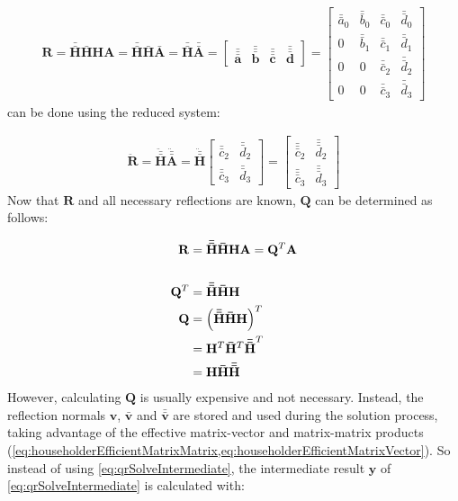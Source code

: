 \begin{align}
\mathbf{R}
= 
\mathbf{\bar{\bar{H}}}\mathbf{\bar{H}}\mathbf{H}\mathbf{A} 
= 
\mathbf{\bar{\bar{H}}}\mathbf{\bar{H}}\mathbf{\bar{A}}
= 
\mathbf{\bar{\bar{H}}}\mathbf{\bar{\bar{A}}}
=
\begin{bmatrix}
\mathbf{\bar{\bar{\bar{a}}}}&\mathbf{\bar{\bar{\bar{b}}}}&\mathbf{\bar{\bar{\bar{c}}}}&\mathbf{\bar{\bar{\bar{d}}}}
\end{bmatrix}	
=
\begin{bmatrix}
\bar{\bar{a}}_0&\bar{\bar{b}}_0&\bar{\bar{c}}_0&\bar{\bar{d}}_0\\
0              &\bar{\bar{b}}_1&\bar{\bar{c}}_1&\bar{\bar{d}}_1\\
0              &0              &\bar{\bar{c}}_2&\bar{\bar{d}}_2\\
0              &0              &\bar{\bar{c}}_3&\bar{\bar{d}}_3
\end{bmatrix}					  
\end{align}
%
can be done using the reduced system:

\begin{align}
\mathbf{\ddot{R}}
= 
\mathbf{\ddot{\bar{\bar{H}}}}\mathbf{\ddot{\bar{\bar{A}}}}
=
\mathbf{\ddot{\bar{\bar{H}}}}
\begin{bmatrix}
\bar{\bar{c}}_2&\bar{\bar{d}}_2\\
\bar{\bar{c}}_3&\bar{\bar{d}}_3
\end{bmatrix}	
=
\begin{bmatrix}
\bar{\bar{\bar{c}}}_2&\bar{\bar{\bar{d}}}_2\\
\bar{\bar{\bar{c}}}_3&\bar{\bar{\bar{d}}}_3
\end{bmatrix}					  
\end{align}
%
Now that $\mathbf{R}$ and all necessary reflections are known, $\mathbf{Q}$ can be determined as follows:

\begin{align}
\mathbf{R} &= \mathbf{\bar{\bar{H}}}\mathbf{\bar{H}}\mathbf{H}\mathbf{A} = \mathbf{Q}^T\mathbf{A}
\\
\\
\mathbf{Q}^T &= \mathbf{\bar{\bar{H}}}\mathbf{\bar{H}}\mathbf{H}\\
\nonumber
\mathbf{Q}   &= \left(\mathbf{\bar{\bar{H}}}\mathbf{\bar{H}}\mathbf{H}\right)^T\\
\nonumber
&= \mathbf{H}^T\mathbf{\bar{H}}^T\mathbf{\bar{\bar{H}}}^T\\
&= \mathbf{H}\mathbf{\bar{H}}\mathbf{\bar{\bar{H}}}
\end{align}
%
However, calculating $\mathbf{Q}$ is usually expensive and not necessary. Instead, the reflection normals $\mathbf{v}$, $\mathbf{\bar{v}}$ and $\mathbf{\bar{\bar{v}}}$ are stored and used during the solution process, taking advantage of the effective matrix-vector and matrix-matrix products (\cref{eq:householderEfficientMatrixMatrix,eq:householderEfficientMatrixVector}).
So instead of using \cref{eq:qrSolveIntermediate}, the intermediate result $\mathbf{y}$ of \cref{eq:qrSolveIntermediate} is calculated with:

